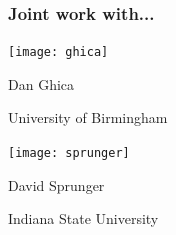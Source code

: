 \begin{frame}
    \frametitle{Joint work with...}
    \centering
    \begin{minipage}{0.4\textwidth}
        \centering

        \texttt{[image: ghica]}

        \vspace{0.5em}

        \alert{Dan Ghica}

        University of Birmingham
    \end{minipage}
    \qquad
    \begin{minipage}{0.4\textwidth}
        \centering
        \texttt{[image: sprunger]}

        \vspace{0.5em}

        \alert{David Sprunger}

        Indiana State University
    \end{minipage}
\end{frame}